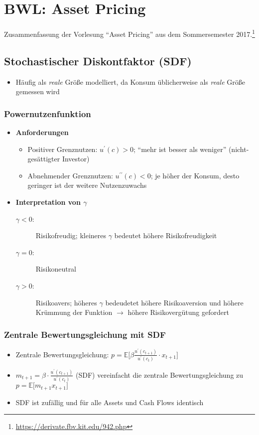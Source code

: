 \chapter{BWL: Asset Pricing}

Zusammenfassung der Vorlesung "`Asset Pricing"' aus dem Sommersemester 2017.\footnote{\url{https://derivate.fbv.kit.edu/942.php}}

\section{Stochastischer Diskontfaktor (SDF)}
\begin{itemize}
	\item Häufig als \textit{reale} Größe modelliert, da Konsum üblicherweise als \textit{reale} Größe gemessen wird
\end{itemize}

\subsection{Powernutzenfunktion}
\begin{itemize}
	\item \textbf{Anforderungen}
	\begin{itemize}
		\item Positiver Grenznutzen: \(u^\prime(c)>0\); "`mehr ist besser als weniger"' (nicht-gesättigter Investor)
		\item Abnehmender Grenznutzen: \(u^{\prime\prime}(c)<0\); je höher der Konsum, desto geringer ist der weitere Nutzenzuwachs
	\end{itemize}
	\item \textbf{Interpretation von \(\gamma\)}
	\begin{description}
		\item[\(\gamma<0\):] Risikofreudig; kleineres \(\gamma\) bedeutet höhere Risikofreudigkeit
		\item[\(\gamma=0\):] Risikoneutral
		\item[\(\gamma>0\):] Risikoavers; höheres \(\gamma\) bedeudetet höhere Risikoaversion und höhere Krümmung der Funktion \(\rightarrow\) höhere Risikovergütung gefordert
	\end{description}
\end{itemize}

\subsection{Zentrale Bewertungsgleichung mit SDF}
\begin{itemize}
	\item Zentrale Bewertungsgleichung: \(p=\mathbb{E} \big\lbrack \beta \frac{u^\prime(c_{t+1})}{u^\prime(c_t)} \cdot x_{t+1} \big\rbrack\)
	\item \(m_{t+1} = \beta \cdot \frac{u^\prime(c_{t+1})}{u^\prime(c_t)}\) (SDF) vereinfacht die zentrale Bewertungsgleichung zu \(p=\mathbb{E} \big\lbrack m_{t+1} x_{t+1} \big\rbrack\)
	\item SDF ist zufällig und für alle Assets und Cash Flows identisch
\end{itemize}

